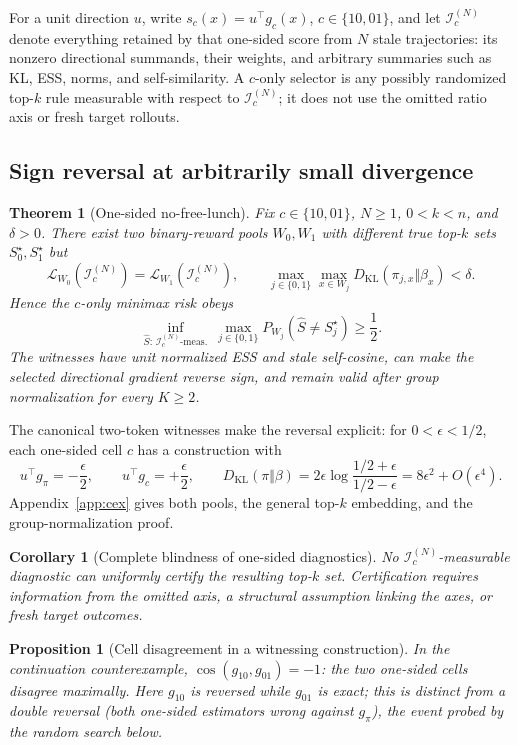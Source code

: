\documentclass[11pt]{article}
\newtheorem{theorem}{Theorem}
\newtheorem{proposition}{Proposition}
\newtheorem{corollary}{Corollary}
\newcommand{\gto}{g_{10}}
\newcommand{\got}{g_{01}}
\newcommand{\gpi}{g_{\pi}}
\begin{document}
For a unit direction $u$, write $s_c(x)=u^\top g_c(x)$,
$c\in\{10,01\}$, and let $\mathcal I_c^{(N)}$ denote everything retained by
that one-sided score from $N$ stale trajectories: its nonzero directional
summands, their weights, and arbitrary summaries such as KL, ESS, norms, and
self-similarity. A $c$-only selector is any possibly randomized top-$k$ rule
measurable with respect to $\mathcal I_c^{(N)}$; it does not use the omitted
ratio axis or fresh target rollouts.

\subsection{Sign reversal at arbitrarily small divergence}

\begin{theorem}[One-sided no-free-lunch]
\label{thm:reversal}
Fix $c\in\{10,01\}$, $N\ge1$, $0<k<n$, and $\delta>0$. There exist two
binary-reward pools $W_0,W_1$ with different true top-$k$ sets
$S_0^\star,S_1^\star$ but
\[
\mathcal L_{W_0}(\mathcal I_c^{(N)})
=\mathcal L_{W_1}(\mathcal I_c^{(N)}),\qquad
\max_{j\in\{0,1\}}\max_{x\in W_j}
D_{\mathrm{KL}}(\pi_{j,x}\Vert\beta_x)<\delta.
\]
Hence the $c$-only minimax risk obeys
\[
\inf_{\widehat S:\,\mathcal I_c^{(N)}\text{-meas.}}\ \max_{j\in\{0,1\}}
P_{W_j}(\widehat S\ne S_j^\star)\ge\frac12.
\]
The witnesses have unit normalized ESS and stale self-cosine, can make the
selected directional gradient reverse sign, and remain valid after group
normalization for every $K\ge2$.
\end{theorem}

The canonical two-token witnesses make the reversal explicit: for
$0<\epsilon<1/2$, each one-sided cell $c$ has a construction with
\[
u^\top\gpi=-\frac\epsilon2,\qquad u^\top g_c=+\frac\epsilon2,\qquad
D_{\mathrm{KL}}(\pi\Vert\beta)
=2\epsilon\log\frac{1/2+\epsilon}{1/2-\epsilon}
=8\epsilon^2+O(\epsilon^4).
\]
Appendix~\ref{app:cex} gives both pools, the general top-$k$ embedding, and
the group-normalization proof.

\begin{corollary}[Complete blindness of one-sided diagnostics]
\label{cor:blind}
No $\mathcal I_c^{(N)}$-measurable diagnostic can uniformly certify the
resulting top-$k$ set. Certification requires information from the omitted
axis, a structural assumption linking the axes, or fresh target outcomes.
\end{corollary}

\begin{proposition}[Cell disagreement in a witnessing construction]
\label{prop:disagree}
In the continuation counterexample, $\cos(\gto,\got)=-1$: the two one-sided
cells disagree maximally. Here $\gto$ is reversed while $\got$ is exact;
this is distinct from a \emph{double} reversal (both one-sided estimators
wrong against $\gpi$), the event probed by the random search below.
\end{proposition}
\end{document}

